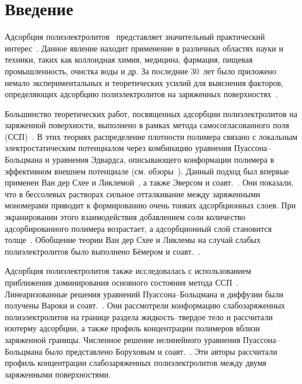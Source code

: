 \documentclass[12pt,a4paper]{article}
\begin{document}
\section{Введение}

Адсорбция полиэлектролитов~\cite{Hara1993, Schmitz1993} представляет значительный практический интерес~\cite{Kawaguchi1992, Fleer1993, Bajpai1997}. Данное явление находит применение в различных областях науки и техники, таких как коллоидная химия, медицина, фармация, пищевая промышленность, очистка воды и др. За последние 30~лет было приложено немало экспериментальных и теоретических усилий для выяснения факторов, определяющих адсорбцию полиэлектролитов на заряженных поверхностях~\cite{Kawaguchi1992, Fleer1993, Bajpai1997}.

Большинство теоретических работ, посвященных адсорбции полиэлектролитов на заряженной поверхности, выполнено в рамках метода самосогласованного поля (ССП)~\cite{Fleer1993}. В этих теориях распределение плотности полимера связано с локальным электростатическим потенциалом через комбинацию уравнения Пуассона--Больцмана и уравнения Эдвардса, описывающего конформации полимера в эффективном внешнем потенциале (см. обзоры~\cite{Fleer1993, Bajpai1997}). Данный подход был впервые применен Ван дер Схее и Ликлемой~\cite{VanderSchee1984}, а также Эверсом и соавт.~\cite{Evers1986}. Они показали, что в бессолевых растворах сильное отталкивание между заряженными мономерами приводит к формированию очень тонких адсорбционных слоев. При экранировании этого взаимодействия добавлением соли количество адсорбированного полимера возрастает, а адсорбционный слой становится толще~\cite{Blaakmeer1990}. Обобщение теории Ван дер Схее и Ликлемы на случай слабых полиэлектролитов было выполнено Бёмером и соавт.~\cite{Bohmer1990}.

Адсорбция полиэлектролитов также исследовалась с использованием приближения доминирования основного состояния метода ССП~\cite{Varoqui1991, Varoqui1993, Borukhov1995, Chatellier1996}. Линеаризованные решения уравнений Пуассона--Больцмана и диффузии были получены Вароки и соавт.~\cite{Varoqui1991}. Они рассмотрели конформацию слабозаряженных полиэлектролитов на границе раздела жидкость--твердое тело и рассчитали изотерму адсорбции, а также профиль концентрации полимеров вблизи заряженной границы. Численное решение нелинейного уравнения Пуассона--Больцмана было представлено Боруховым и соавт.~\cite{Borukhov1995}. Эти авторы рассчитали профиль концентрации слабозаряженных полиэлектролитов между двумя заряженными поверхностями.
\end{document}
